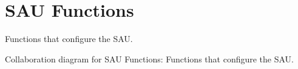 \hypertarget{group___c_m_s_i_s___core___s_a_u_functions}{}\section{S\+AU Functions}
\label{group___c_m_s_i_s___core___s_a_u_functions}


Functions that configure the S\+AU.  


Collaboration diagram for S\+AU Functions\+:
Functions that configure the S\+AU. 

